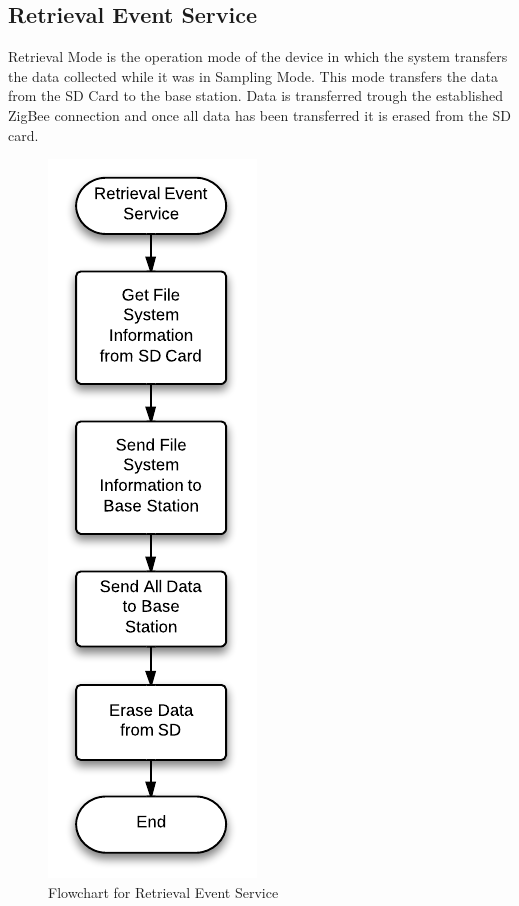 \subsection{Retrieval Event Service}
Retrieval Mode is the operation mode of the device in which the system transfers the data collected while it was in Sampling Mode. This mode transfers the data from the SD Card to the base station. Data is transferred trough the established ZigBee connection and once all data has been transferred it is erased from the SD card.
\begin{figure}[H]
	\centering
	\includegraphics[scale=1.0]{img/RetrievalEventService}
	\caption{Flowchart for Retrieval Event Service \label{fig:retrivalMode}}
\end{figure}


